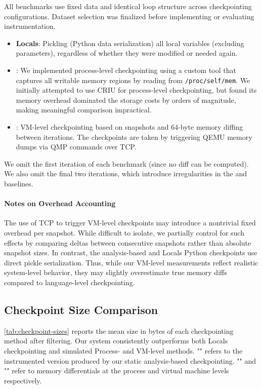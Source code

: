 All benchmarks use fixed data and identical loop structure across checkpointing configurations. Dataset selection was finalized before implementing or evaluating instrumentation.

\begin{itemize}
  \item \textbf{Locals}: Pickling (Python data serialization) all local variables (excluding parameters), regardless of whether they were modified or needed again.
  \item \textbf{\PROCDIFF}: We implemented process-level checkpointing using a custom tool that captures all writable memory regions by reading from \texttt{/proc/self/mem}. We initially attempted to use CRIU for process-level checkpointing, but found its memory overhead dominated the storage costs by orders of magnitude, making meaningful comparison impractical. 
  \item \textbf{\VMDIFF}: VM-level checkpointing based on snapshots and 64-byte memory diffing between iterations. The checkpoints are taken by triggering QEMU memory dumps via QMP commands over TCP.
\end{itemize}

We omit the first iteration of each benchmark (since no diff can be computed). We also omit the final two iterations, which introduce irregularities in the {\PROCDIFF} and {\VMDIFF} baselines.

\paragraph{Notes on Overhead Accounting}
The use of TCP to trigger VM-level checkpoints may introduce a nontrivial fixed overhead per snapshot. While difficult to isolate, we partially control for such effects by comparing deltas between consecutive snapshots rather than absolute snapshot sizes. In contrast, the analysis-based and Locals Python checkpoints use direct pickle serialization. Thus, while our VM-level measurements reflect realistic system-level behavior, they may slightly overestimate true memory diffs compared to language-level checkpointing.

\subsection{Checkpoint Size Comparison}

\autoref{tab:checkpoint-sizes} reports the mean size in bytes of each checkpointing method after filtering. Our system consistently outperforms both Locals checkpointing and simulated Process- and VM-level methods. "\spyte" refers to the instrumented version produced by our static analysis-based checkpointing. "\PROCDIFF" and "\VMDIFF" refer to memory differentials at the process and virtual machine levels respectively.

